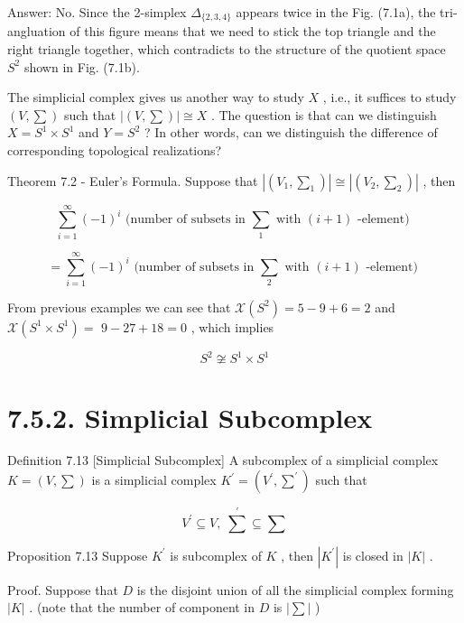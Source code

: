 Answer: No. Since the 2-simplex \({\Delta }_{\{ 2,3,4\} }\) appears twice in the Fig. (7.1a), the tri-angluation of this figure means that we need to stick the top triangle and the right triangle together, which contradicts to the structure of the quotient space \({S}^{2}\) shown in Fig. (7.1b).

The simplicial complex gives us another way to study \(X\) , i.e., it suffices to study \(\left( {V,\sum }\right)\) such that \(\left| \left( {V,\sum }\right) \right|  \cong  X\) . The question is that can we distinguish \(X = {S}^{1} \times  {S}^{1}\) and \(Y = {S}^{2}\) ? In other words, can we distinguish the difference of corresponding topological realizations?

Theorem 7.2 - Euler’s Formula. Suppose that \(\left| \left( {{V}_{1},{\sum }_{1}}\right) \right|  \cong  \left| \left( {{V}_{2},{\sum }_{2}}\right) \right|\) , then

\[
\mathop{\sum }\limits_{{i = 1}}^{\infty }{\left( -1\right) }^{i}\text{ (number of subsets in }{\sum }_{1}\text{ with }\left( {i + 1}\right) \text{ -element) }
\]

\[
= \mathop{\sum }\limits_{{i = 1}}^{\infty }{\left( -1\right) }^{i}\text{ (number of subsets in }{\sum }_{2}\text{ with }\left( {i + 1}\right) \text{ -element) }
\]

From previous examples we can see that \(\mathcal{X}\left( {S}^{2}\right)  = 5 - 9 + 6 = 2\) and \(\mathcal{X}\left( {{S}^{1} \times  {S}^{1}}\right)  =\)  \(9 - {27} + {18} = 0\) , which implies

\[
{S}^{2} ≆ {S}^{1} \times  {S}^{1}
\]

\section*{7.5.2. Simplicial Subcomplex}

Definition 7.13 [Simplicial Subcomplex] A subcomplex of a simplicial complex \(K = \left( {V,\sum }\right)\) is a simplicial complex \({K}^{\prime } = \left( {{V}^{\prime },{\sum }^{\prime }}\right)\) such that

\[
{V}^{\prime } \subseteq  V,\;{\sum }^{\prime } \subseteq  \sum
\]

Proposition 7.13 Suppose \({K}^{\prime }\) is subcomplex of \(K\) , then \(\left| {K}^{\prime }\right|\) is closed in \(\left| K\right|\) .

Proof. Suppose that \(D\) is the disjoint union of all the simplicial complex forming \(\left| K\right|\) . (note that the number of component in \(D\) is \(\left| \sum \right|\) )

